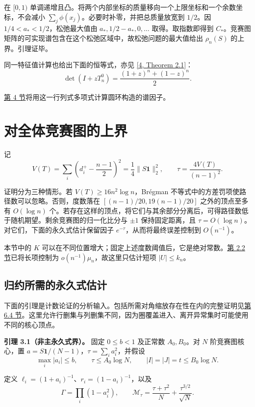 \documentclass[11pt,a4paper]{article}
\makeatletter
\newcommand{\paperstatement}[3]{\par\addvspace{6pt}\Needspace{4\baselineskip}\phantomsection\def\@currentlabel{#2}\label{#3}\noindent\textbf{#1}\enspace}
\newcommand{\paperref}[2]{\hyperref[#1]{#2}}
\makeatother
\begin{document}
在 \([0,1)\) 单调递增且凸。将两个内部坐标的质量移向一个上限坐标和一个余数坐标，不会减小 \(\sum_j\phi(x_j)\)。必要时补零，并把总质量放宽到 \(1/2\)。因 \(1/4<a_*<1/2\)，松弛最大值由 \(a_*,1/2-a_*,0,\ldots\) 取得。取指数即得到 \(C_*\)。竞赛图矩阵的可实现谱包含在这个松弛区域中，故松弛问题的最大值给出 \(\rho_n(S)\) 的上界。引理证毕。

同一特征值计算也给出下面的恒等式，亦见 \paperref{bib-4}{[4, Theorem 2.1]}：
\[\det(I+zT_n^0)=\frac{(1+z)^n+(1-z)^n}{2}.\]

\paperref{sec-4}{第 4 节}将用这一行列式多项式计算圆环构造的谱因子。

\section{对全体竞赛图的上界}\label{sec-3}

记
\[V(T)=\sum_i\left(d_i^+-\frac{n-1}{2}\right)^2
=\frac14\|S\mathbf1\|_2^2,
\qquad
\tau=\frac{4V(T)}{(n-1)^2}.\]

证明分为三种情形。若 \(V(T)\ge16n^2\log n\)，Brégman 不等式中的方差罚项使路径数可以忽略。否则，度数落在 \([(n-1)/20,19(n-1)/20]\) 之外的顶点至多有 \(O(\log n)\) 个。若存在这样的顶点，将它们与其余部分分离后，可得路径数低于随机期望。剩余竞赛图的归一化比分与 \(\pm1\) 保持固定距离，且 \(\tau=O(\log n)\)。对它们，下面的永久式估计保留因子 \(e^{-\tau}\)，从而将最终误差控制到 \(O(n^{-1})\)。

本节中的 \(K\) 可以在不同位置增大；固定上述度数阈值后，它是绝对常数。\paperref{sec-2.2}{第 2.2 节}已将长项控制为 \(o(n^{-1})\mu_n\)，故这里只估计短项 \(|U|\le k_n\)。

\subsection{归约所需的永久式估计}\label{sec-3.1}

下面的引理是计数论证的分析输入。包括所需对角缩放存在性在内的完整证明见\paperref{sec-6.4}{第 6.4 节}。这里允许行删集与列删集不同，因为圈覆盖进入、离开异常集时可能使用不同的核心顶点。

\paperstatement{引理 3.1（非主永久式界）。}{3.1}{thm-3.1} 固定 \(0\le b<1\) 及正常数 \(A_0,B_0\)。对 \(N\) 阶竞赛图核心，置 \(a=S\mathbf1/(N-1)\)，\(\tau=\sum_i a_i^2\)，并假设
\[\max_i|a_i|\le b,\qquad
\tau\le A_0\log N,\qquad
|I|=|J|=t\le B_0\log N.\]

定义 \(\ell_i=(1+a_i)^{-1}\)、\(r_i=(1-a_i)^{-1}\)，以及
\[\Gamma=\prod_i(1-a_i^2),\qquad
\mathcal M_\tau=\frac{\tau+\tau^2}{N}+\frac{\tau^{3/2}}{\sqrt N}.\]
\end{document}
